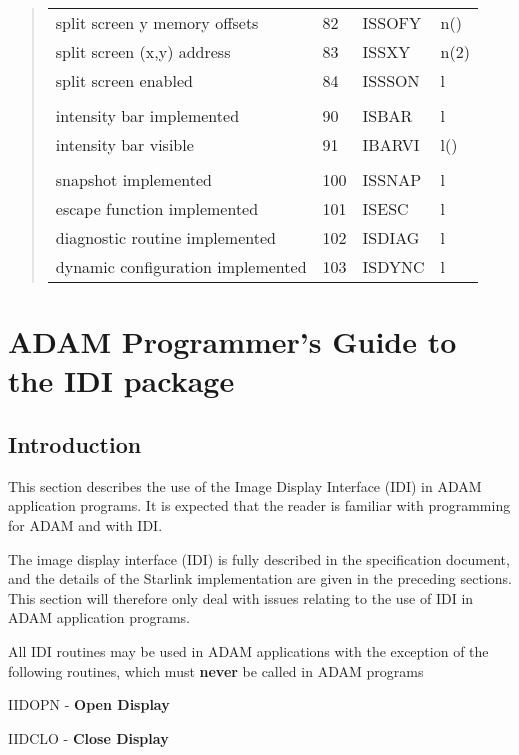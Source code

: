 \documentclass[11pt,nolof]{starlink}
\begin{document}
\begin{quote}
\begin{tabular}{llll}
split screen y memory offsets & 82 & ISSOFY & n() \\
split screen (x,y) address & 83 & ISSXY & n(2) \\
split screen enabled & 84 & ISSSON & l \\
\\
intensity bar implemented & 90 & ISBAR & l \\
intensity bar visible & 91 & IBARVI & l() \\
\\
snapshot implemented & 100 & ISSNAP & l \\
escape function implemented & 101 & ISESC & l \\
diagnostic routine implemented & 102 & ISDIAG & l \\
dynamic configuration implemented & 103 & ISDYNC & l \\
\end{tabular}
\end{quote}

\newpage
\section{ADAM Programmer's Guide to the IDI package}
\label{se:apg}

\subsection{Introduction}

This section describes the use of the Image Display Interface (IDI) in
ADAM application programs. It is expected that the reader is familiar with
programming for ADAM and with IDI.

The image display interface (IDI) is fully described in the specification
document, and the details of the Starlink implementation are given in
the preceding sections. This section will therefore only deal with issues
relating to the use of IDI in ADAM application programs.

All IDI routines may be used in ADAM applications with the exception of
the following routines, which must \textbf{never} be called in ADAM programs

\hspace*{20mm}\begin{minipage}{140mm}

\noindent
IIDOPN - \textbf{Open Display}

\noindent
IIDCLO - \textbf{Close Display}

\end{minipage}
\end{document}
